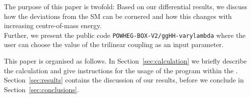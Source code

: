 The purpose of this paper is twofold: Based on our differential results, we discuss how the deviations from the SM can be cornered and how this changes with increasing centre-of-mass energy. \\
Further, we present the public code {\tt POWHEG-BOX-V2/ggHH-varylambda} where the user can choose the value of the trilinear coupling as an input parameter.

This paper is organised as follows. In Section~\ref{sec:calculation} we briefly describe the calculation and give instructions for the usage of the program within the \powhegbox. Section~\ref{sec:results} contains the discussion of our results, before we conclude in Section~\ref{sec:conclusions}.